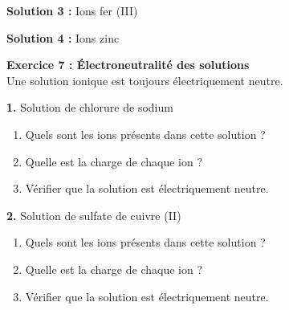 \documentclass[11pt,a4paper]{article}
\newcommand{\cadreblanc}[1]{%
	\medskip\framebox[\linewidth][c]{%
		\rule{0mm}{#1mm}}\par
	\medskip}
\begin{document}
	\cadreblanc{20}
	
	\textbf{Solution 3 :} Ions fer (III) 
	
	\cadreblanc{20}
	
	\textbf{Solution 4 :} Ions zinc 
	
	\cadreblanc{20}
	
	\vfill
	
	
	
	\textbf{Exercice 7 : Électroneutralité des solutions} \\
	
	Une solution ionique est toujours électriquement neutre.
	
	\vspace{5mm}
	
	\textbf{1.} Solution de chlorure de sodium 
	
	\begin{enumerate}[label=\alph*)]
		\item Quels sont les ions présents dans cette solution ?
		
		\cadreblanc{15}
		
		\item Quelle est la charge de chaque ion ?
		
		\cadreblanc{15}
		
		\item Vérifier que la solution est électriquement neutre.
		
		\cadreblanc{15}
	\end{enumerate}
	
	\vspace{5mm}
	
	\textbf{2.} Solution de sulfate de cuivre (II) 
	
	\begin{enumerate}[label=\alph*)]
		\item Quels sont les ions présents dans cette solution ?
		
		\cadreblanc{15}
		
		\item Quelle est la charge de chaque ion ?
		
		\cadreblanc{15}
		
		\item Vérifier que la solution est électriquement neutre.
		
		\cadreblanc{15}
	\end{enumerate}
	
	\vfill
	
	\newpage
	
\end{document}
